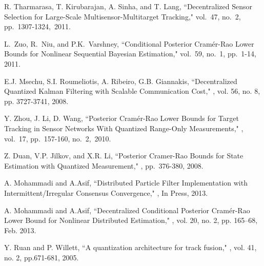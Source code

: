 \documentclass[10pt,twocolumn,twoside]{IEEEtran}
\begin{document}
\begin{thebibliography}{10}

 R. Tharmarasa, T. Kirubarajan, A. Sinha, and
  T. Lang, \newblock ``Decentralized Sensor Selection for Large-Scale
  Multisensor-Multitarget Tracking,"  vol.~47, no.~2,
  pp.~1307-1324,~2011.

 L.~Zuo, R.~Niu, and P.K.~Varshney, \newblock
  ``Conditional Posterior Cram\'er-Rao Lower Bounds for Nonlinear
  Sequential Bayesian Estimation,"  vol.~59, no.~1, pp.~1-14, 2011.


 E.J. Msechu, S.I. Roumeliotis, A. Ribeiro,
  G.B. Giannakis, \newblock ``Decentralized Quantized Kalman Filtering
  with Scalable Communication Cost," , vol. 56, no. 8, pp. 3727-3741, 2008.

 Y. Zhou, J. Li, D. Wang, \newblock ``Posterior
  Cram\'er-Rao Lower Bounds for Target Tracking in Sensor Networks
  With Quantized Range-Only Measurements," , vol.~17, pp.~157-160, no.~2,~2010.

 Z. Duan, V.P. Jilkov, and X.R. Li, \newblock
  ``Posterior Cramer-Rao Bounds for State Estimation with Quantized
  Measurement," , pp.~376-380, 2008.

 A. Mohammadi and A.Asif, \newblock ``Distributed
  Particle Filter Implementation with Intermittent/Irregular Consensus
  Convergence," , In Press,
  2013.

 A. Mohammadi and A.Asif, \newblock ``Decentralized
  Conditional Posterior Cram\'er-Rao Lower Bound for Nonlinear
  Distributed Estimation," ,
  vol. 20, no. 2, pp. 165--68, Feb. 2013.

Y. Ruan and P. Willett,
\newblock ``A quantization architecture for track fusion,"
, vol. 41, no. 2, pp.671-681, 2005.

\end{thebibliography}
\end{document}
